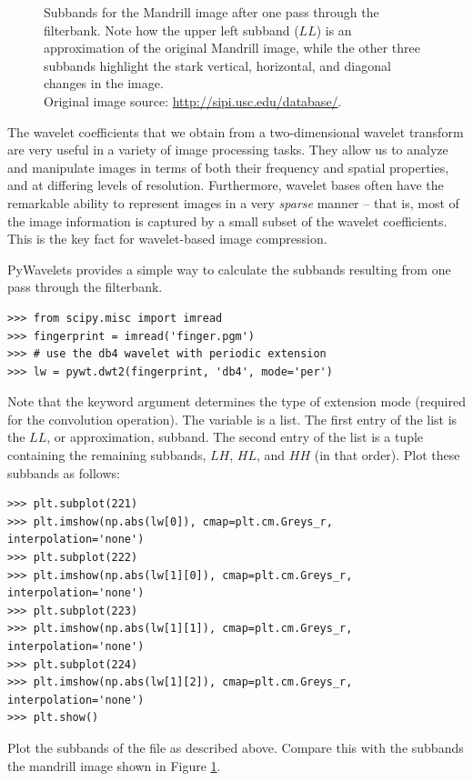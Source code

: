 \begin{figure}
\begin{subfigure}{0.4\textwidth}
       \end{subfigure}
    \caption{Subbands for the Mandrill image after one pass through the filterbank.
    Note how the upper left subband ($LL$) is an approximation of the original Mandrill image, while the other
    three subbands highlight the stark vertical, horizontal, and diagonal changes in the image.\\
    Original image source: \url{http://sipi.usc.edu/database/}.}
    \label{fig:dwt2D}
\end{figure}
The wavelet coefficients that we obtain from a two-dimensional wavelet transform are very useful in a variety of image processing tasks.
They allow us to analyze and manipulate images in terms of both their
frequency and spatial properties, and at differing levels of resolution.
Furthermore, wavelet bases often have the remarkable ability to represent
images in a very \textit{sparse} manner -- that is, most of the image
information is captured by a small subset of the wavelet coefficients.
This is the key fact for wavelet-based image compression.

PyWavelets provides a simple way to calculate the subbands resulting from one pass through the filterbank.
\begin{lstlisting}
>>> from scipy.misc import imread
>>> fingerprint = imread('finger.pgm')
>>> # use the db4 wavelet with periodic extension
>>> lw = pywt.dwt2(fingerprint, 'db4', mode='per')
\end{lstlisting}
Note that the  keyword argument determines the type of extension mode (required for the convolution
operation).
The variable  is a list. The first entry of the list is the $LL$, or approximation, subband.
The second entry of the list is a tuple containing the remaining subbands, $LH$, $HL$, and $HH$ (in that order).
Plot these subbands as follows:
\begin{lstlisting}
>>> plt.subplot(221)
>>> plt.imshow(np.abs(lw[0]), cmap=plt.cm.Greys_r, interpolation='none')
>>> plt.subplot(222)
>>> plt.imshow(np.abs(lw[1][0]), cmap=plt.cm.Greys_r, interpolation='none')
>>> plt.subplot(223)
>>> plt.imshow(np.abs(lw[1][1]), cmap=plt.cm.Greys_r, interpolation='none')
>>> plt.subplot(224)
>>> plt.imshow(np.abs(lw[1][2]), cmap=plt.cm.Greys_r, interpolation='none')
>>> plt.show()
\end{lstlisting}

\begin{problem}
Plot the subbands of the file  as described above.
Compare this with the subbands the mandrill image shown in Figure \ref{fig:dwt2D}.
\end{problem}

